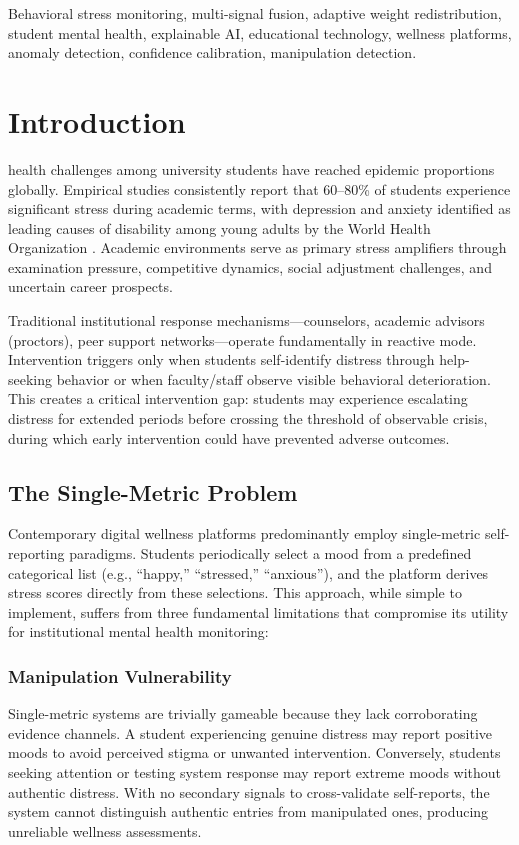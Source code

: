 \documentclass[journal]{IEEEtran}
\begin{document}
\begin{IEEEkeywords}
Behavioral stress monitoring, multi-signal fusion, adaptive weight redistribution, student mental health, explainable AI, educational technology, wellness platforms, anomaly detection, confidence calibration, manipulation detection.
\end{IEEEkeywords}

\section{Introduction}

 health challenges among university students have reached epidemic proportions globally. Empirical studies consistently report that 60--80\% of students experience significant stress during academic terms, with depression and anxiety identified as leading causes of disability among young adults by the World Health Organization \cite{beiter2015, who2017}. Academic environments serve as primary stress amplifiers through examination pressure, competitive dynamics, social adjustment challenges, and uncertain career prospects.

Traditional institutional response mechanisms---counselors, academic advisors (proctors), peer support networks---operate fundamentally in reactive mode. Intervention triggers only when students self-identify distress through help-seeking behavior or when faculty/staff observe visible behavioral deterioration. This creates a critical intervention gap: students may experience escalating distress for extended periods before crossing the threshold of observable crisis, during which early intervention could have prevented adverse outcomes.

\subsection{The Single-Metric Problem}

Contemporary digital wellness platforms predominantly employ single-metric self-reporting paradigms. Students periodically select a mood from a predefined categorical list (e.g., ``happy,'' ``stressed,'' ``anxious''), and the platform derives stress scores directly from these selections. This approach, while simple to implement, suffers from three fundamental limitations that compromise its utility for institutional mental health monitoring:

\subsubsection{Manipulation Vulnerability}
Single-metric systems are trivially gameable because they lack corroborating evidence channels. A student experiencing genuine distress may report positive moods to avoid perceived stigma or unwanted intervention. Conversely, students seeking attention or testing system response may report extreme moods without authentic distress. With no secondary signals to cross-validate self-reports, the system cannot distinguish authentic entries from manipulated ones, producing unreliable wellness assessments.
\end{document}
